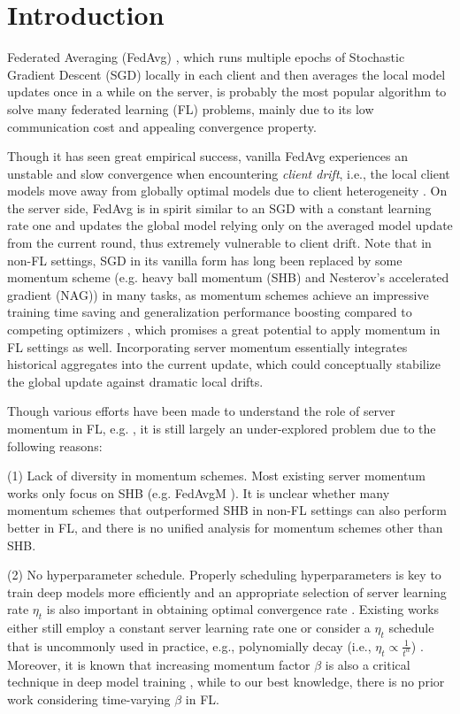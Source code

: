 \section{Introduction}
\label{sec:intro}

Federated Averaging (FedAvg) \citep{McMahan2017FedAvg}, which runs multiple epochs of Stochastic Gradient Descent (SGD) locally in each client and then averages the local model updates once in a while on the server, is probably the most popular algorithm to solve many federated learning (FL) problems, mainly due to its low communication cost and appealing convergence property.

Though it has seen great empirical success, vanilla FedAvg experiences an unstable and slow convergence when encountering \textit{client drift}, i.e., the local client models move away from globally optimal models due to client heterogeneity \citep{karimireddy2020scaffold}. On the server side, FedAvg is in spirit similar to an SGD with a constant learning rate one and updates the global model relying only on the averaged model update from the current round, thus extremely vulnerable to client drift. Note that in non-FL settings, SGD in its vanilla form has long been replaced by some momentum scheme (e.g. heavy ball momentum (SHB) and Nesterov's accelerated gradient (NAG)) in many tasks, as momentum schemes achieve an impressive training time saving and generalization performance boosting compared to competing optimizers \cite{Sutskever13Init,Wilson2017Generalization}, which promises a great potential to apply momentum in FL settings as well. Incorporating server momentum essentially integrates historical aggregates into the current update, which could conceptually stabilize the global update against dramatic local drifts. 

Though various efforts have been made to understand the role of server momentum in FL, e.g. \citep{Hsu2019MeasuringTE,rothchild20fetchsgd}, it is still largely an under-explored problem due to the following reasons:

(1) Lack of diversity in momentum schemes. Most existing server momentum works only focus on SHB (e.g. FedAvgM \citep{Hsu2019MeasuringTE}). It is unclear whether many momentum schemes that outperformed SHB in non-FL settings can also perform better in FL, and there is no unified analysis for momentum schemes other than SHB. 

(2) No hyperparameter schedule. Properly scheduling hyperparameters is key to train deep models more efficiently and an appropriate selection of server learning rate $\eta_t$ is also important in obtaining optimal convergence rate \citep{yang2021achieving}. Existing works either still employ a constant server learning rate one or consider a $\eta_t$ schedule that is uncommonly used in practice, e.g., polynomially decay (i.e., $\eta_t\propto\frac{1}{t^\alpha}$) \citep{khanduri2021stem}. Moreover, it is known that increasing momentum factor $\beta$ is also a critical technique in deep model training \citep{Sutskever13Init,Smith18DontDecay}, while to our best knowledge, there is no prior work considering time-varying $\beta$ in FL. 

